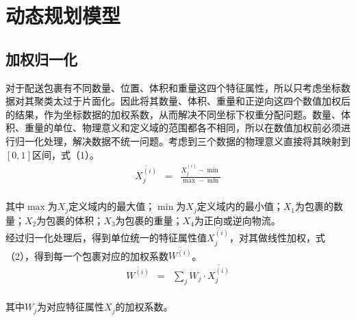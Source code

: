 \documentclass[twocolumn]{jbuaa}
\begin{document}
	\section{动态规划模型}

	\subsection{加权归一化}

	对于配送包裹有不同数量、位置、体积和重量这四个特征属性，所以只考虑坐标数据对其聚类太过于片面化。因此将其数量、体积、重量和正逆向这四个数值加权后的结果，作为坐标数据的加权系数，从而解决不同坐标下权重分配问题。数量、体积、重量的单位、物理意义和定义域的范围都各不相同，所以在数值加权前必须进行归一化处理，解决数据不统一问题。考虑到三个数据的物理意义直接将其映射到$[0,1]$区间，式（1）。
	\begin{eqnarray}
		\overline {X^{\left( i\right) }_{j}}&=&\frac {X^{\left( i\right) }_{j}-\min }{\max -\min }
	\end{eqnarray}
	\\\indent{}其中$\max$为$X_{j}$定义域内的最大值；$\min$为$X_{j}$定义域内的最小值；$X_{1}$为包裹的数量；$X_{2}$为包裹的体积；$X_{3}$为包裹的重量；$X_{4}$为正向或逆向物流。
	\\\indent{}经过归一化处理后，得到单位统一的特征属性值$\overline {X^{\left( i\right) }_{j}}$，对其做线性加权，式（2），得到每一个包裹对应的加权系数$\overline {W^{\left( i\right) }}$。
	\begin{eqnarray}
		\overline {W^{\left( i\right) }}&=&\sum _{j}W_{j}\cdot \overline {X^{\left( i\right) }_{j}}
	\end{eqnarray}
	\\\indent{}其中$W_{j}$为对应特征属性$X_{j}$的加权系数。
\end{document}
